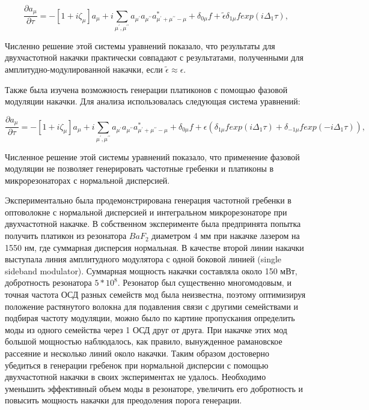 \begin{equation}
\frac{\partial a_\mu}{\partial \tau}=-[1+i\zeta_{\mu}]a_\mu+i\sum_{\mu^\prime,\mu^{\prime\prime}} a_{\mu^\prime}a_{\mu^{\prime\prime}}a_{\mu^\prime+\mu^{\prime\prime}-\mu}^*+\delta_{0\mu}f+\tilde{\epsilon}\delta_{1\mu}f exp(i\Delta_1\tau),
\end{equation}

Численно решение этой системы уравнений показало, что результаты для двухчастотной накачки практически совпадают с результатами, полученными для амплитудно-модулированной накачки, если $\tilde{\epsilon}\approx\epsilon$.

Также была изучена возможность генерации платиконов с помощью фазовой модуляции накачки. Для анализа использовалась
следующая система уравнений:

\begin{equation}
\frac{\partial a_\mu}{\partial \tau}=-[1+i\zeta_{\mu}]a_\mu+i\sum_{\mu^\prime,\mu^{\prime\prime}} a_{\mu^\prime}a_{\mu^{\prime\prime}}a_{\mu^\prime+\mu^{\prime\prime}-\mu}^*+\delta_{0\mu}f+\epsilon(\delta_{1\mu}f exp(i\Delta_1\tau)+\delta_{-1\mu}f exp(-i\Delta_1\tau)),
\end{equation}

Численное решение этой системы уравнений показало, что применение фазовой модуляции не позволяет генерировать частотные гребенки и платиконы в микрорезонаторах с нормальной дисперсией.

Экспериментально была продемонстрирована генерация частотной гребенки в оптоволокне с нормальной дисперсией \cite{Antikainen2015} и интегральном микрорезонаторе \cite{Liu:17} при двухчастотной накачке. В собственном эксперименте была предпринята попытка получить платикон из резонатора $BaF_2$ диаметром 4 мм при накачке лазером на 1550 нм, где суммарная дисперсия нормальная. В качестве второй линии накачки выступала линия амплитудного модулятора с одной боковой линией (single sideband modulator). Суммарная мощность накачки составляла около 150 мВт, добротность резонатора $5*10^8$. Резонатор был существенно многомодовым, и точная частота ОСД разных семейств мод была неизвестна, поэтому оптимизируя положение растянутого волокна для подавления связи с другими семействами и подбирая частоту модуляции, можно было по картине пропускания определить моды из одного семейства через 1 ОСД друг от друга. При накачке этих мод большой мощностью наблюдалось, как правило, вынужденное рамановское рассеяние и несколько линий около накачки. Таким образом достоверно убедиться в генерации гребенок при нормальной дисперсии с помощью двухчастотной накачки в своих экспериментах не удалось. Необходимо уменьшить эффективный объем моды в резонаторе, увеличить его добротность и повысить мощность накачки для преодоления порога генерации.


